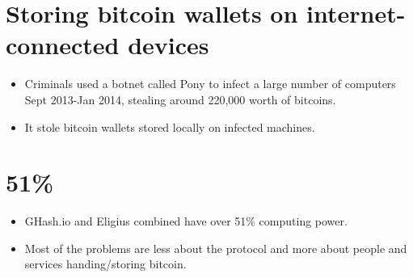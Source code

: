 \documentclass{article}
\begin{document}
\begin{itemize}
\section*{Storing bitcoin wallets on internet-connected devices}
\begin{itemize}
  \item Criminals used a botnet called Pony to infect a large number of computers Sept 2013-Jan 2014, stealing around 220,000 worth of bitcoins.
  \item It stole bitcoin wallets stored locally on infected machines. 

\end{itemize}
\section*{51\%}
\begin{itemize}
  \item GHash.io and Eligius combined have over 51\% computing power.
  \item Most of the problems are less about the protocol and more about people and services handing/storing bitcoin.
\end{itemize}
\end{itemize}
\end{document}
